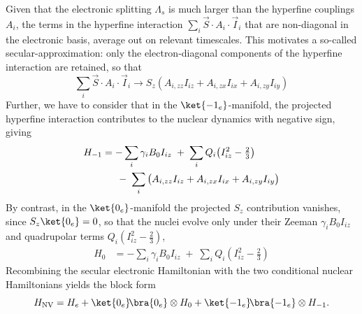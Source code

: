 Given that the electronic splitting $\Lambda_s$ is much larger than the hyperfine couplings $A_i$, the terms in the hyperfine interaction \(\sum_i \vec S\cdot A_i\cdot \vec I_i\) that are non-diagonal in the electronic basis, average out on relevant timescales. This motivates a so-called secular-approximation: only the electron-diagonal components of the hyperfine interaction are retained, so that
\[
\sum_i \vec S\cdot A_i\cdot \vec I_i \longrightarrow
S_z\left(A_{i,zz}I_{iz}+
A_{i,zx}I_{ix}+
A_{i,zy}I_{iy}\right)
\]
Further, we have to consider that in the $\ket{-1_e}$-manifold, the projected hyperfine interaction contributes to the nuclear dynamics with negative sign, giving
\begin{equation}
\begin{aligned}
H_{-1} &= -\sum_i \gamma_i B_0 I_{iz} \;+\; \sum_i Q_i\!\left(I_{iz}^2-\tfrac{2}{3}\right)\\
&\hspace{0.43cm}\;-\; \sum_i \big(A_{i,zz} I_{iz}+A_{i,zx} I_{ix}+A_{i,zy} I_{iy}\big) \label{eq:H-1_def}
\end{aligned}
\end{equation}
By contrast, in the $\ket{0_e}$-manifold the projected $S_z$ contribution vanishes, since $S_z\ket{0_e}=0$, so that the nuclei evolve only under their Zeeman $\gamma_i B_0 I_{iz}$ and quadrupolar terms $Q_i\!\left(I_{iz}^2-\tfrac{2}{3}\right)$,
\begin{equation}
\begin{aligned}
H_{0} &= -\sum_i \gamma_i B_0 I_{iz} \;+\; \sum_i Q_i\!\left(I_{iz}^2-\tfrac{2}{3}\right)
\label{eq:H0_def}
\end{aligned}
\end{equation}
Recombining the secular electronic Hamiltonian with the two conditional nuclear Hamiltonians yields the block form
\begin{equation}
H_{\mathrm{NV}}
= H_e
+ \ket{0_e}\!\bra{0_e}\otimes H_{0}
+ \ket{-1_e}\!\bra{-1_e}\otimes H_{-1}.
\label{eq:block_form}
\end{equation}

